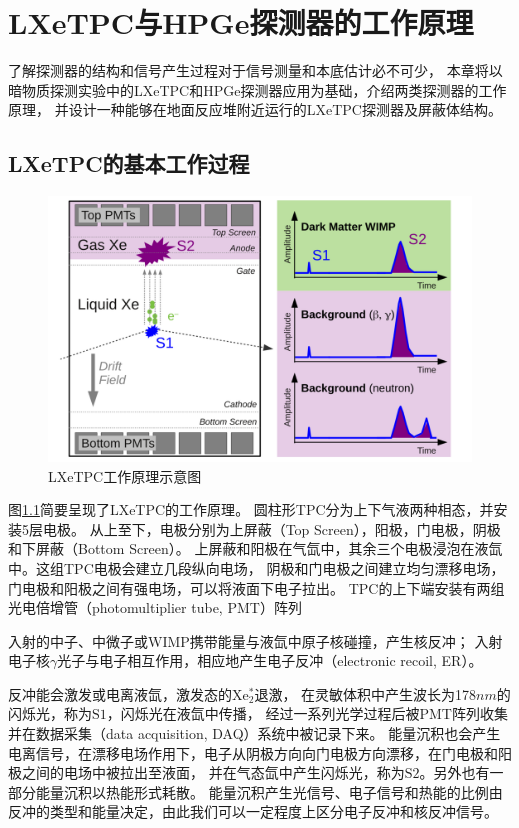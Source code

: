 
\chapter{LXeTPC与HPGe探测器的工作原理}

了解探测器的结构和信号产生过程对于信号测量和本底估计必不可少，
本章将以暗物质探测实验中的LXeTPC和HPGe探测器应用为基础，介绍两类探测器的工作原理，
并设计一种能够在地面反应堆附近运行的LXeTPC探测器及屏蔽体结构。

\section{LXeTPC的基本工作过程}

\begin{figure}
    \centering
    \includegraphics[width=0.7\linewidth]{figures/tpc_signals.png}
    \caption{\label{fig:tpc_principle} LXeTPC工作原理示意图}
\end{figure}

图\ref{fig:tpc_principle}简要呈现了LXeTPC的工作原理\cite{xenon_collaboration_xenon1t_2017}。
圆柱形TPC分为上下气液两种相态，并安装5层电极。
从上至下，电极分别为上屏蔽（Top Screen），阳极，门电极，阴极和下屏蔽（Bottom Screen）。
上屏蔽和阳极在气氙中，其余三个电极浸泡在液氙中。这组TPC电极会建立几段纵向电场，
阴极和门电极之间建立均匀漂移电场，门电极和阳极之间有强电场，可以将液面下电子拉出。
TPC的上下端安装有两组光电倍增管（photomultiplier tube, PMT）阵列

入射的中子、中微子或WIMP携带能量与液氙中原子核碰撞，产生核反冲；
入射电子核$\gamma$光子与电子相互作用，相应地产生电子反冲（electronic recoil, ER）。

反冲能会激发或电离液氙，激发态的$\mathrm{Xe_2^*}$退激，
在灵敏体积中产生波长为178$\si{nm}$的闪烁光，称为$\mathrm{S1}$，闪烁光在液氙中传播，
经过一系列光学过程后被PMT阵列收集并在数据采集（data acquisition, DAQ）系统中被记录下来。
能量沉积也会产生电离信号，在漂移电场作用下，电子从阴极方向向门电极方向漂移，在门电极和阳极之间的电场中被拉出至液面，
并在气态氙中产生闪烁光，称为$\mathrm{S2}$。另外也有一部分能量沉积以热能形式耗散。
能量沉积产生光信号、电子信号和热能的比例由反冲的类型和能量决定，由此我们可以一定程度上区分电子反冲和核反冲信号。


